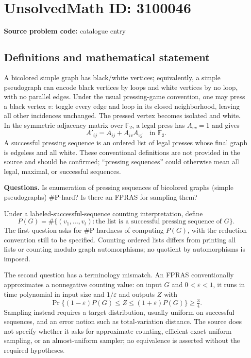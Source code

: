 \documentclass[11pt]{article}
\newcommand{\F}{\mathbb{F}}
\begin{document}
\section*{UnsolvedMath ID: 3100046}
\textbf{Source problem code:} catalogue entry
\subsection{Definitions and mathematical statement}
A bicolored simple graph has black/white vertices; equivalently, a simple pseudograph can encode black vertices by loops and white vertices by no loop, with no parallel edges. Under the usual pressing-game convention, one may press a black vertex $v$: toggle every edge and loop in its closed neighborhood, leaving all other incidences unchanged. The pressed vertex becomes isolated and white. In the symmetric adjacency matrix over $\F_2$, a legal press has $A_{vv}=1$ and gives
\[
 A'_{ij}=A_{ij}+A_{iv}A_{vj}\quad\text{in }\F_2.
\]
A successful pressing sequence is an ordered list of legal presses whose final graph is edgeless and all white. These conventional definitions are not provided in the source and should be confirmed; ``pressing sequences'' could otherwise mean all legal, maximal, or successful sequences.

\textbf{Questions.} Is enumeration of pressing sequences of bicolored graphs (simple pseudographs) $\#\mathrm P$-hard? Is there an FPRAS for sampling them?

Under a labeled-successful-sequence counting interpretation, define
\[
 P(G)=\#\{(v_1,\ldots,v_t):\text{the list is a successful pressing sequence of }G\}.
\]
The first question asks for $\#\mathrm P$-hardness of computing $P(G)$, with the reduction convention still to be specified. Counting ordered lists differs from printing all lists or counting modulo graph automorphisms; no quotient by automorphisms is imposed.

The second question has a terminology mismatch. An FPRAS conventionally approximates a nonnegative counting value: on input $G$ and $0<\varepsilon<1$, it runs in time polynomial in input size and $1/\varepsilon$ and outputs $Z$ with
\[
 \Pr\{(1-\varepsilon)P(G)\leq Z\leq(1+\varepsilon)P(G)\}\geq\tfrac34.
\]
Sampling instead requires a target distribution, usually uniform on successful sequences, and an error notion such as total-variation distance. The source does not specify whether it asks for approximate counting, efficient exact uniform sampling, or an almost-uniform sampler; no equivalence is asserted without the required hypotheses.
\end{document}
